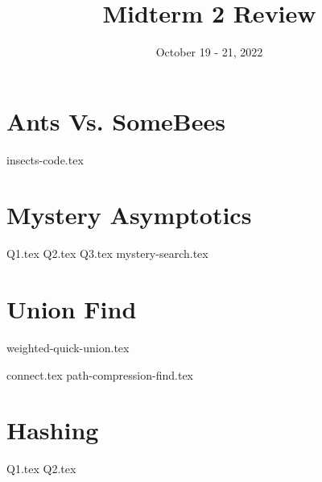 \documentclass[11pt]{exam}
\title{Midterm 2 Review}
\date{October 19 - 21, 2022}
\begin{document}
\maketitle


\section{Ants Vs. SomeBees}
\begin{questions}
{insects-code.tex}
\end{questions}


\pagebreak
\section{Mystery Asymptotics}
\begin{questions}
{Q1.tex}
{Q2.tex}
\newpage
{Q3.tex}
{mystery-search.tex}
\end{questions}


\pagebreak
\section{Union Find}
{weighted-quick-union.tex}
\begin{questions}
{connect.tex}
\pagebreak
{path-compression-find.tex}
\end{questions}


\pagebreak
\section{Hashing}
\begin{questions}
{Q1.tex}
{Q2.tex}
\end{questions}
\end{document}
